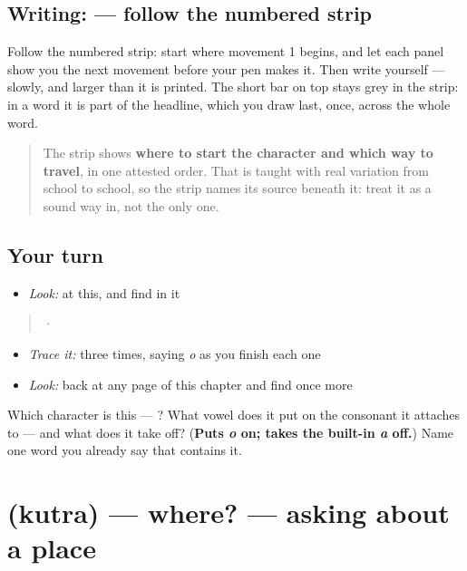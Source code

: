 \subsection*{Writing:  — follow the numbered strip}

Follow the numbered strip: start where movement 1 begins, and let each panel show you the next movement before your pen makes it. Then write  yourself — slowly, and larger than it is printed. The short bar on top stays grey in the strip: in a word it is part of the headline, which you draw last, once, across the whole word.

\begin{quote}
The strip shows \textbf{where to start the character and which way to travel}, in one attested order. That is taught with real variation from school to school, so the strip names its source beneath it: treat it as a sound way in, not the only one.
\end{quote}

\subsection*{Your turn}
\begin{itemize}
\raggedright
  \item \emph{Look:} at this, and find  in it
\end{itemize}

\begin{quote}
  ·   
\end{quote}

\begin{itemize}
\raggedright
  \item \emph{Trace it:}  three times, saying \emph{o} as you finish each one
  \item \emph{Look:} back at any page of this chapter and find  once more
\end{itemize}

\begin{tcolorbox}[breakable,colback=teal!4,colframe=teal!35!black,title={Before you move on}]
Which character is this — ? What vowel does it put on the consonant it attaches to — and what does it take off? (\textbf{Puts \emph{o} on; takes the built-in \emph{a} off.}) Name one word you already say that contains it.
\end{tcolorbox}
\section[\texorpdfstring{\sk{कुत्र} (kutra)}{कुत्र (kutra)}]{ (kutra) — where? — asking about a place}

